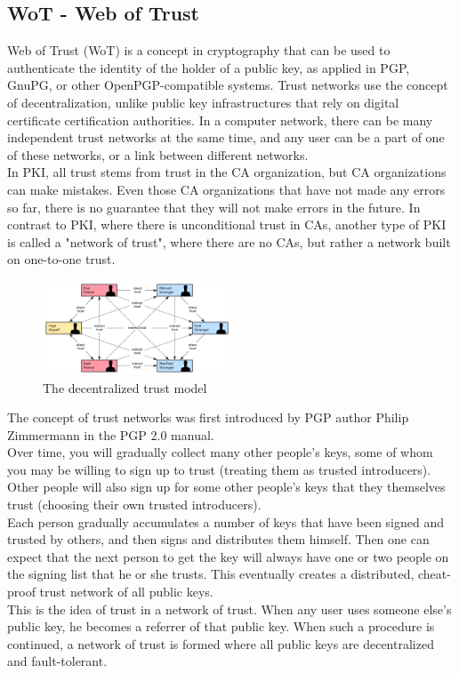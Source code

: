 \subsection{WoT - Web of Trust}
Web of Trust (WoT)\cite{b7} is a concept in cryptography that can be used to authenticate the 
identity of the holder of a public key, as applied in PGP, GnuPG, or other OpenPGP-compatible 
systems\cite{b8, b9, b10}. Trust networks use the concept of decentralization, unlike public key 
infrastructures that rely on digital certificate certification authorities. In a 
computer network, there can be many independent trust networks at the same time, and 
any user can be a part of one of these networks, or a link between different networks\cite{b11}.
\\
In PKI, all trust stems from trust in the CA organization, but CA organizations can make 
mistakes. Even those CA organizations that have not made any errors so far, there is 
no guarantee that they will not make errors in the future. In contrast to PKI, where 
there is unconditional trust in CAs, another type of PKI is called a "network of trust", 
where there are no CAs, but rather a network built on one-to-one trust\cite{b7}.

\begin{figure}[H] %
    \centering %
    \includegraphics[width=0.5\textwidth]{figures/decentralized_trust_model.png} %
    \caption{The decentralized trust model} %
    \label{Fig.2: decentralized_trust_model} %
\end{figure}

The concept of trust networks was first introduced by PGP author Philip Zimmermann in 
the PGP 2.0 manual\cite{b7}.
\\
Over time, you will gradually collect many other people's keys, some of whom you may 
be willing to sign up to trust (treating them as trusted introducers). Other people 
will also sign up for some other people's keys that they themselves trust (choosing 
their own trusted introducers).
\\
Each person gradually accumulates a number of keys that have been signed and trusted 
by others, and then signs and distributes them himself. Then one can expect that the 
next person to get the key will always have one or two people on the signing list that 
he or she trusts. This eventually creates a distributed, cheat-proof trust network of 
all public keys.
\\
This is the idea of trust in a network of trust. When any user uses someone else's 
public key, he becomes a referrer of that public key. When such a procedure is 
continued, a network of trust is formed where all public keys are decentralized 
and fault-tolerant.

